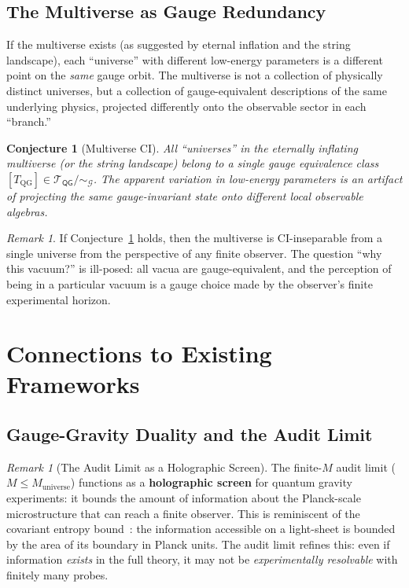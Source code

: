 \documentclass[12pt,a4paper]{article}
\newtheorem{conjecture}[theorem]{Conjecture}
\theoremstyle{remark}
\newtheorem{remark}[theorem]{Remark}
\newcommand{\G}{\mathcal{G}}
\newcommand{\T}{\mathcal{T}}
\newcommand{\CI}{\textsf{CI}}
\newcommand{\QG}{\textsf{QG}}
\begin{document}
\subsection{The Multiverse as Gauge Redundancy}

If the multiverse exists (as suggested by eternal inflation and the string landscape), each ``universe'' with different low-energy parameters is a different point on the \emph{same} gauge orbit. The multiverse is not a collection of physically distinct universes, but a collection of gauge-equivalent descriptions of the same underlying physics, projected differently onto the observable sector in each ``branch.''

\begin{conjecture}[Multiverse CI]
\label{conj:multiverse_ci}
All ``universes'' in the eternally inflating multiverse (or the string landscape) belong to a single gauge equivalence class $[T_{\text{QG}}] \in \T_{\QG}/\sim_{\G}$. The apparent variation in low-energy parameters is an artifact of projecting the same gauge-invariant state onto different local observable algebras.
\end{conjecture}

\begin{remark}
\label{rem:multiverse_ci}
If Conjecture~\ref{conj:multiverse_ci} holds, then the multiverse is \CI{}-inseparable from a single universe from the perspective of any finite observer. The question ``why this vacuum?'' is ill-posed: all vacua are gauge-equivalent, and the perception of being in a particular vacuum is a gauge choice made by the observer's finite experimental horizon.
\end{remark}


\section{Connections to Existing Frameworks}
\label{sec:connections}

\subsection{Gauge-Gravity Duality and the Audit Limit}

\begin{remark}[The Audit Limit as a Holographic Screen]
\label{rem:audit_screen}
The finite-$M$ audit limit ($M \leq M_{\text{universe}}$) functions as a \textbf{holographic screen} for quantum gravity experiments: it bounds the amount of information about the Planck-scale microstructure that can reach a finite observer. This is reminiscent of the covariant entropy bound~\cite{bousso2002holographic}: the information accessible on a light-sheet is bounded by the area of its boundary in Planck units. The audit limit refines this: even if information \emph{exists} in the full theory, it may not be \emph{experimentally resolvable} with finitely many probes.
\end{remark}
\end{document}
